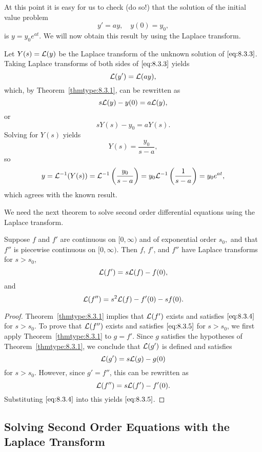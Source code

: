 \documentclass{ximera}
\begin{document}
At this point it is easy for us to check (do so!)
that the solution of the
initial value problem
\begin{equation}\label{eq:8.3.3}
y'=ay, \quad  y(0)=y_0,
\end{equation}
 is $y=y_0e^{at}$.
We will now obtain this result by using the Laplace transform.

Let $Y(s)={\cal L}(y)$ be the Laplace transform of the unknown solution
of $\eqref{eq:8.3.3}$. Taking Laplace transforms of both sides of
$\eqref{eq:8.3.3}$ yields
$$
{\cal L}(y')={\cal L}(ay),
$$
which, by Theorem~\ref{thmtype:8.3.1}, can be rewritten as
$$
s{\cal L}(y)-y(0)=a{\cal L}(y),
$$
or
$$
sY(s)-y_0=aY(s).
$$
Solving for $Y(s)$ yields
$$
Y(s)=\frac{y_0}{s-a},
$$
so
$$
y={\cal L}^{-1}(Y(s))={\cal L}^{-1}\left(\frac{y_0}{s-a}\right)=y_0{\cal
L}^{-1}\left(\frac{1}{s-a}\right)=y_0e^{at},
$$
which agrees with the known result.

We  need the next theorem to solve second order differential equations
using  the Laplace transform.

\begin{theorem}\label{thmtype:8.3.2}
Suppose $f$ and $f'$ are continuous on $[0,\infty)$ and of
exponential order $s_0,$ and that $f''$ is piecewise continuous on
$[0,\infty).$ Then $f$, $f'$, and $f''$ have Laplace transforms for $s
> s_0$,
\begin{equation}\label{eq:8.3.4}
{\cal L}(f')=s {\cal L}(f)-f(0),
\end{equation}
and
\begin{equation}\label{eq:8.3.5}
{\cal L}(f'')=s^2{\cal L}(f)-f'(0)-sf(0).
\end{equation}
\end{theorem}

\begin{proof}
Theorem~\ref{thmtype:8.3.1} implies that ${\cal L}(f')$ exists and
satisfies $\eqref{eq:8.3.4}$ for $s>s_0$. To prove that ${\cal L}(f'')$
exists and satisfies $\eqref{eq:8.3.5}$ for $s>s_0$, we first apply
Theorem~\ref{thmtype:8.3.1} to $g=f'$. Since $g$ satisfies the hypotheses
of Theorem~\ref{thmtype:8.3.1}, we conclude that ${\cal L}(g')$ is defined
and satisfies
$$
{\cal L}(g')=s{\cal L}(g)-g(0)
$$
for $s>s_0$. However, since $g'=f''$, this can be rewritten as
$$
{\cal L}(f'')=s{\cal L}(f')-f'(0).
$$
Substituting $\eqref{eq:8.3.4}$ into this yields
$\eqref{eq:8.3.5}$.
\end{proof}

\subsection*{Solving Second Order Equations with the Laplace Transform}
\end{document}
